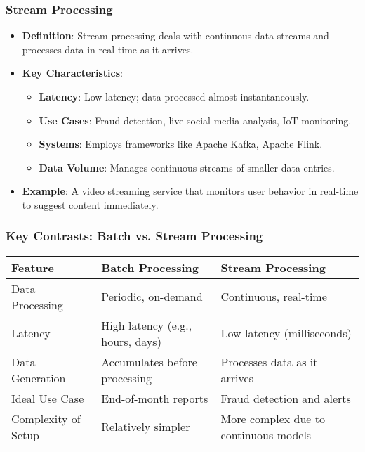 \documentclass{beamer}
\begin{document}
\begin{frame}[fragile]
    \frametitle{Stream Processing}
    \begin{itemize}
        \item \textbf{Definition}: Stream processing deals with continuous data streams and processes data in real-time as it arrives.
        
        \item \textbf{Key Characteristics}:
        \begin{itemize}
            \item \textbf{Latency}: Low latency; data processed almost instantaneously.
            \item \textbf{Use Cases}: Fraud detection, live social media analysis, IoT monitoring.
            \item \textbf{Systems}: Employs frameworks like Apache Kafka, Apache Flink.
            \item \textbf{Data Volume}: Manages continuous streams of smaller data entries.
        \end{itemize}
        
        \item \textbf{Example}: A video streaming service that monitors user behavior in real-time to suggest content immediately.
    \end{itemize}
\end{frame}

\begin{frame}[fragile]
    \frametitle{Key Contrasts: Batch vs. Stream Processing}
    \begin{center}
        \begin{tabular}{|l|l|l|}
            \hline
            \textbf{Feature} & \textbf{Batch Processing} & \textbf{Stream Processing} \\
            \hline
            Data Processing & Periodic, on-demand & Continuous, real-time \\ 
            \hline
            Latency & High latency (e.g., hours, days) & Low latency (milliseconds) \\ 
            \hline
            Data Generation & Accumulates before processing & Processes data as it arrives \\ 
            \hline
            Ideal Use Case & End-of-month reports & Fraud detection and alerts \\ 
            \hline
            Complexity of Setup & Relatively simpler & More complex due to continuous models \\ 
            \hline
        \end{tabular}
    \end{center}
\end{frame}
\end{document}
